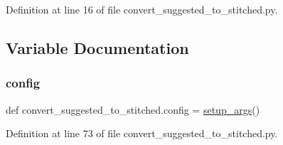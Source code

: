 Definition at line 16 of file convert\+\_\+suggested\+\_\+to\+\_\+stitched.\+py.



\subsection{Variable Documentation}
\mbox{\label{namespaceconvert__suggested__to__stitched_af8347b96cb6291fa574eedbd718e7726}} 
\subsubsection{\texorpdfstring{config}{config}}
{\footnotesize\ttfamily def convert\+\_\+suggested\+\_\+to\+\_\+stitched.\+config = \hyperlink{namespaceconvert__suggested__to__stitched_a6d40b7687a1f943f799a2b537ebecce4}{setup\+\_\+args}()}



Definition at line 73 of file convert\+\_\+suggested\+\_\+to\+\_\+stitched.\+py.

